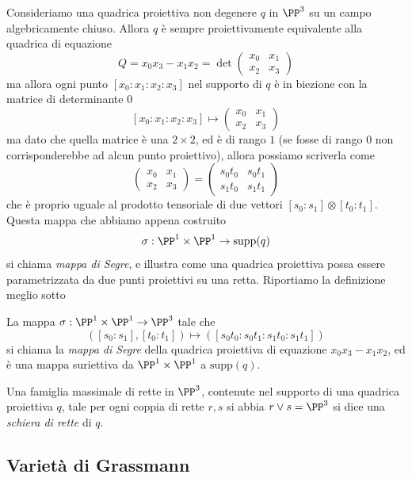 \documentclass[11pt]{scrartcl}
\begin{document}
	Consideriamo una quadrica proiettiva non degenere $q$ in $\PP^3$ su un campo algebricamente chiuso. Allora $q$ è sempre proiettivamente equivalente alla quadrica di equazione
	$$Q=x_0x_3-x_1x_2=\det\begin{pmatrix}
		x_0 & x_1 \\
		x_2 & x_3
	\end{pmatrix}$$
	ma allora ogni punto $[x_0:x_1:x_2:x_3]$ nel supporto di $q$ è in biezione con la matrice di determinante $0$
	$$[x_0:x_1:x_2:x_3]\mapsto
	\begin{pmatrix}
		x_0 & x_1 \\
		x_2 & x_3
	\end{pmatrix}
	$$
	ma dato che quella matrice è una $2\times 2$, ed è di rango $1$ (se fosse di rango $0$ non corrisponderebbe ad alcun punto proiettivo), allora possiamo scriverla come
	$$
	\begin{pmatrix}
		x_0 & x_1 \\
		x_2 & x_3
	\end{pmatrix}=
	\begin{pmatrix}
		s_0t_0 & s_0t_1 \\
		s_1t_0 & s_1t_1
	\end{pmatrix}
	$$
	che è proprio uguale al prodotto tensoriale di due vettori $[s_0:s_1]\otimes[t_0:t_1]$. Questa mappa che abbiamo appena costruito
	$$\sigma:\PP^1\times \PP^1 \to \text{supp}(q)$$
	si chiama \textit{mappa di Segre}, e illustra come una quadrica proiettiva possa essere parametrizzata da due punti proiettivi su una retta. Riportiamo la definizione meglio sotto
	\begin{definition}
		La mappa $\sigma:\PP^1\times \PP^1 \to \PP^3$ tale che
		$$\left([s_0:s_1],\left[t_0:t_1\right]\right)\mapsto \left(\left[s_0t_0:s_0t_1:s_1t_0:s_1t_1\right]\right)$$
		si chiama la \textit{mappa di Segre} della quadrica proiettiva di equazione $x_0x_3-x_1x_2$, ed è una mappa suriettiva da $\PP^1\times \PP^1$ a $\text{supp}(q)$.
	\end{definition}
	\begin{definition}
		Una famiglia massimale di rette in $\PP^3$, contenute nel supporto di una quadrica proiettiva $q$, tale per ogni coppia di rette $r,s$ si abbia $r\lor s = \PP^3$ si dice una \textit{schiera di rette} di $q$.
	\end{definition}
	
	
	\subsection{Varietà di Grassmann}
	
\end{document}
